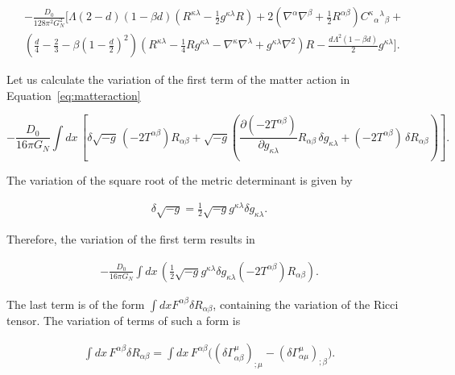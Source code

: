 \documentclass[aps,preprintnumbers,superscriptaddress,longbibliography]{revtex4-1}
\begin{document}
\begin{equation}
\begin{split}
& -\frac{D_0}{128 \pi^2 G_{N}^2}\bigg[\Lambda(2-d)(1-\beta d)\left(R^{\kappa \lambda}-\frac{1}{2}g^{\kappa \lambda}R\right)+2\left(\nabla^{\alpha}\nabla^{\beta}+\frac{1}{2}R^{\alpha \beta}\right)C^{\kappa}\text{}_{\alpha}\text{}^{\lambda}\text{}_{\beta}+\nonumber\\ 
&\left(\frac{d}{4}-\frac{2}{3}-\beta \left(1-\frac{d}{2}\right)^2\right)\left(R^{\kappa \lambda}-\frac{1}{4}R g^{\kappa \lambda}-\nabla^{\kappa}\nabla^{\lambda}+g^{\kappa \lambda}\nabla^2\right)R-\frac{d\Lambda^2 (1 -\beta d)}{2}g^{\kappa \lambda}\bigg].
\end{split}
\end{equation}

Let us calculate the variation of the first term of the matter action in Equation~\eqref{eq:matteraction}

\begin{equation}
\label{eq: eqvar1}
-\frac{D_0}{16 \pi G_{N}}\int dx \, \left[\delta \sqrt{-g}\,(-2T^{\alpha \beta})R_{\alpha \beta}+\sqrt{-g}\left(\frac{\partial (-2T^{\alpha \beta})}{\partial g_{\kappa \lambda}}R_{\alpha \beta}\,\delta g_{\kappa \lambda}+(-2T^{\alpha \beta})\,\delta R_{\alpha \beta}\right)\right].  
\end{equation}

The variation of the square root of the metric determinant is given by

\begin{eqnarray}
\delta \sqrt{-g}=\frac{1}{2}\sqrt{-g}g^{\kappa \lambda}\delta g_{\kappa \lambda}.
\end{eqnarray}


Therefore, the variation of the first term results in

\begin{eqnarray}
-\frac{D_0}{16 \pi G_{N}}\int dx\, \left(\frac{1}{2}\sqrt{-g}g^{\kappa \lambda}\delta g_{\kappa \lambda}(-2T^{\alpha \beta})R_{\alpha \beta}\right).  
\end{eqnarray}

The last term is of the form $\int d x F^{\alpha \beta} \delta R_{\alpha \beta}$, containing the variation of the Ricci tensor. The variation of terms of such a form is

\begin{eqnarray}
\int dx\, F^{\alpha \beta} \delta R_{\alpha \beta}=\int dx\, F^{\alpha \beta}\big( (\delta \Gamma^{\mu}_{\alpha \beta})_{;\mu}-(\delta \Gamma^{\mu}_{\alpha \mu})_{;\beta}\big).  
\end{eqnarray}
\end{document}
